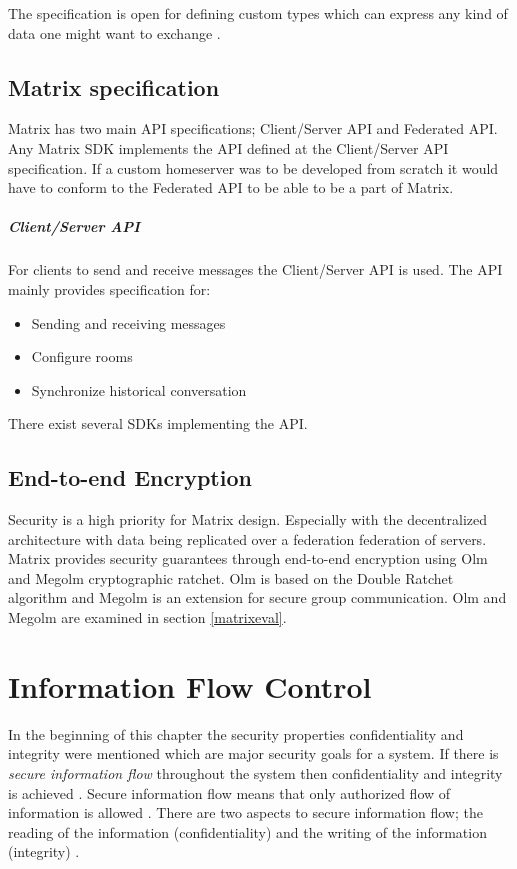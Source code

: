 The specification is open for defining custom types which can express any kind of data one might want to exchange \cite{typeofevent}.


\subsection{Matrix specification}
Matrix has two main API specifications; Client/Server API and Federated API. Any Matrix SDK implements the API defined at the Client/Server API specification. If a custom homeserver was to be developed from scratch it would have to conform to the Federated API to be able to be a part of Matrix. 

\subparagraph{Client/Server API}
For clients to send and receive messages the Client/Server API is used. The API mainly provides specification for:

\begin{itemize}
	\item Sending and receiving messages
	\item Configure rooms
	\item Synchronize historical conversation
\end{itemize}

 There exist several SDKs implementing the API.  

\subsection{End-to-end Encryption}
Security is a high priority for Matrix design. Especially with the decentralized architecture with data being replicated over a federation federation of servers. Matrix provides security guarantees through end-to-end encryption using Olm and Megolm cryptographic ratchet. Olm is based on the Double Ratchet algorithm and Megolm is an extension for secure group communication. Olm and Megolm are examined in section \ref{matrixeval}.



\newpage
\section{Information Flow Control} %
In the beginning of this chapter the security properties confidentiality and integrity were mentioned which are major security goals for a system. If there is \emph{secure information flow} throughout the system then confidentiality and integrity is achieved \cite{Hedin2011}. Secure information flow means that only authorized flow of information is allowed \cite{Denning1976}. There are two aspects to secure information flow; the reading of the information (confidentiality) and the writing of the information (integrity) \cite{Hedin2011}. 

